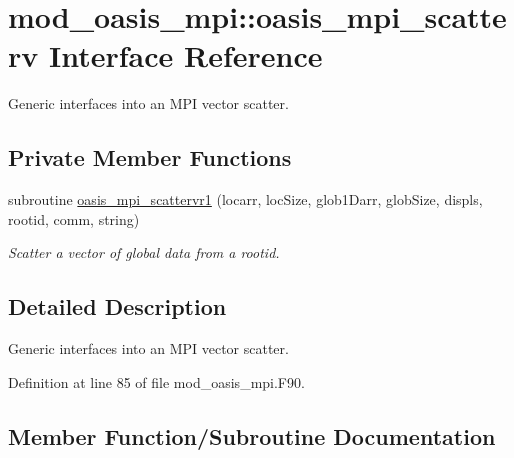 \hypertarget{interfacemod__oasis__mpi_1_1oasis__mpi__scatterv}{}\section{mod\+\_\+oasis\+\_\+mpi\+:\+:oasis\+\_\+mpi\+\_\+scatterv Interface Reference}
\label{interfacemod__oasis__mpi_1_1oasis__mpi__scatterv}


Generic interfaces into an M\+PI vector scatter.  


\subsection*{Private Member Functions}
\begin{DoxyCompactItemize}
\item 
subroutine \hyperlink{interfacemod__oasis__mpi_1_1oasis__mpi__scatterv_a3fcba01cf7b4de3c6c05fa8999f5c00d}{oasis\+\_\+mpi\+\_\+scattervr1} (locarr, loc\+Size, glob1\+Darr, glob\+Size, displs, rootid, comm, string)
\begin{DoxyCompactList}\small\item\em Scatter a vector of global data from a rootid. \end{DoxyCompactList}\end{DoxyCompactItemize}


\subsection{Detailed Description}
Generic interfaces into an M\+PI vector scatter. 

Definition at line 85 of file mod\+\_\+oasis\+\_\+mpi.\+F90.



\subsection{Member Function/\+Subroutine Documentation}
\mbox{\label{interfacemod__oasis__mpi_1_1oasis__mpi__scatterv_a3fcba01cf7b4de3c6c05fa8999f5c00d}} 
